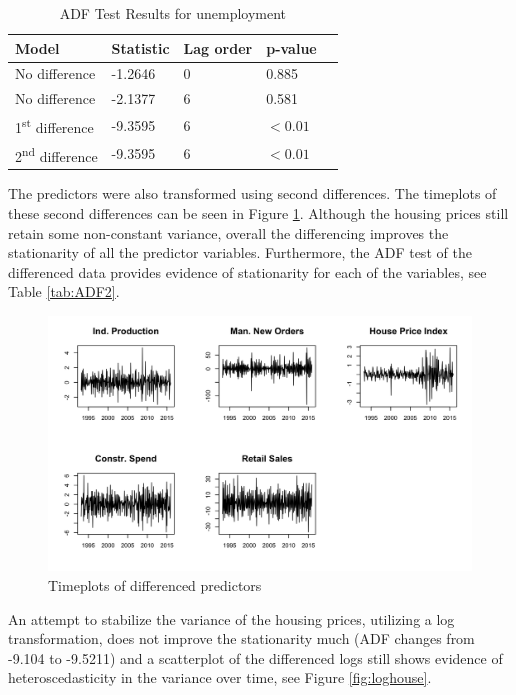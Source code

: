 \documentclass[twoside,twocolumn]{article}
\begin{document}
		 \begin{table}[htb]
		 \centering
		 \caption{ADF Test Results for unemployment}
		 \label{tab:ADF}
		 \begin{tabular}{lllll}
		 \hline
		 \textbf{Model} 								& \textbf{Statistic} & \textbf{Lag order} 	& \textbf{p-value}\\ \hline
		 No  difference 								&   -1.2646 				& 0 								& 0.885\\
		 No  difference 								&   -2.1377 				& 6 								& 0.581\\
		 1\textsuperscript{st} difference 	&  -9.3595 				& 6 								&\( < 0.01\)\\
		 2\textsuperscript{nd} difference 	&  -9.3595 				& 6 								& \( < 0.01\)\\	 \hline
		 \end{tabular}
		 \end{table}
The predictors were also transformed using second differences. The timeplots of these second differences can be seen in Figure \ref{fig:statpred}. Although the housing prices still retain some non-constant variance, overall the differencing improves the stationarity of all the predictor variables.  Furthermore, the ADF test of the differenced data provides evidence of stationarity for each of the variables, see Table \ref{tab:ADF2}.

		\begin{figure}[htb]
		\centering
		\caption{Timeplots of differenced predictors}
		\label{fig:statpred}
		\includegraphics[width=\linewidth]{images/StationaryPred}
		\end{figure}

An attempt to stabilize the variance of the housing prices, utilizing a log transformation, does not improve the stationarity much (ADF changes from -9.104 to -9.5211) and a scatterplot of the differenced logs still shows evidence of heteroscedasticity in the variance over time, see Figure \ref{fig:loghouse}.
\end{document}
